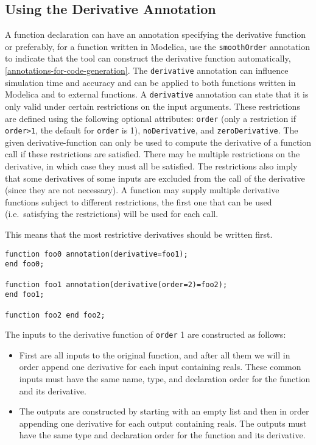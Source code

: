 \subsection{Using the Derivative Annotation}\label{using-the-derivative-annotation}

A function declaration can have an annotation  specifying the derivative function or preferably, for a function written in Modelica, use the \lstinline!smoothOrder! annotation to indicate that the tool can construct the derivative function automatically, \cref{annotations-for-code-generation}.
The \lstinline!derivative! annotation can influence simulation time and accuracy and can be applied to both functions written in Modelica and to external functions.
A \lstinline!derivative! annotation can state that it is only valid under certain restrictions on the input arguments.
These restrictions are defined using the following optional attributes: \lstinline!order! (only a restriction if \lstinline!order>1!, the default for \lstinline!order! is 1), \lstinline!noDerivative!, and \lstinline!zeroDerivative!.
The given derivative-function can only be used to compute the derivative of a function call if these restrictions are satisfied.
There may be multiple restrictions on the derivative, in which case they must all be satisfied. The restrictions also imply that some derivatives of some inputs are excluded from the call of the derivative (since they are not necessary).
A function may supply multiple derivative functions subject to different restrictions, the first one that can be used (i.e.\ satisfying the restrictions) will be used for each call.

\begin{nonnormative}
This means that the most restrictive derivatives should be written first.
\end{nonnormative}

\begin{example}
\begin{lstlisting}[language=modelica]
function foo0 annotation(derivative=foo1);
end foo0;

function foo1 annotation(derivative(order=2)=foo2);
end foo1;

function foo2 end foo2;
\end{lstlisting}
\end{example}

The inputs to the derivative function of \lstinline!order! 1 are constructed as
follows:
\begin{itemize}
\item
  First are all inputs to the original function, and after all them we
  will in order append one derivative for each input containing reals.
  These common inputs must have the same name, type, and declaration
  order for the function and its derivative.
\item
  The outputs are constructed by starting with an empty list and then in
  order appending one derivative for each output containing reals. The
  outputs must have the same type and declaration order for the function
  and its derivative.
\end{itemize}

